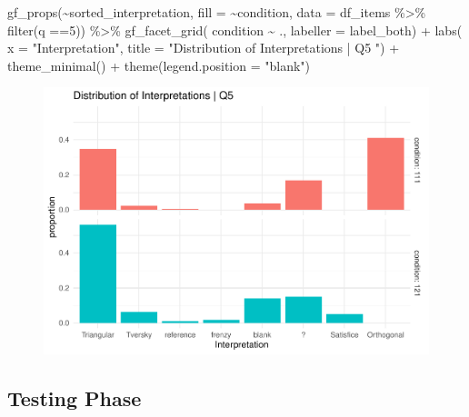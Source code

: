 \documentclass[
  letterpaper,
  DIV=11,
  numbers=noendperiod]{scrreprt}
\newenvironment{Shaded}{\begin{snugshade}}{\end{snugshade}}
\newcommand{\AttributeTok}[1]{\textcolor[rgb]{0.40,0.45,0.13}{#1}}
\newcommand{\DecValTok}[1]{\textcolor[rgb]{0.68,0.00,0.00}{#1}}
\newcommand{\FunctionTok}[1]{\textcolor[rgb]{0.28,0.35,0.67}{#1}}
\newcommand{\NormalTok}[1]{\textcolor[rgb]{0.00,0.23,0.31}{#1}}
\newcommand{\SpecialCharTok}[1]{\textcolor[rgb]{0.37,0.37,0.37}{#1}}
\newcommand{\StringTok}[1]{\textcolor[rgb]{0.13,0.47,0.30}{#1}}
\begin{document}
\begin{Shaded}
\begin{Highlighting}[]
\FunctionTok{gf\_props}\NormalTok{(}\SpecialCharTok{\textasciitilde{}}\NormalTok{sorted\_interpretation, }\AttributeTok{fill =} \SpecialCharTok{\textasciitilde{}}\NormalTok{condition, }\AttributeTok{data =}\NormalTok{ df\_items }\SpecialCharTok{\%\textgreater{}\%} \FunctionTok{filter}\NormalTok{(q }\SpecialCharTok{==}\DecValTok{5}\NormalTok{)) }\SpecialCharTok{\%\textgreater{}\%} 
  \FunctionTok{gf\_facet\_grid}\NormalTok{( condition }\SpecialCharTok{\textasciitilde{}}\NormalTok{ ., }\AttributeTok{labeller =}\NormalTok{ label\_both) }\SpecialCharTok{+} 
  \FunctionTok{labs}\NormalTok{( }\AttributeTok{x =} \StringTok{"Interpretation"}\NormalTok{, }\AttributeTok{title =} \StringTok{"Distribution of Interpretations | Q5 "}\NormalTok{) }\SpecialCharTok{+} 
  \FunctionTok{theme\_minimal}\NormalTok{() }\SpecialCharTok{+} \FunctionTok{theme}\NormalTok{(}\AttributeTok{legend.position =} \StringTok{"blank"}\NormalTok{)}
\end{Highlighting}
\end{Shaded}

\begin{figure}[H]

{\centering \includegraphics{analysis/SGC3A/2_sgc3A_scoring_files/figure-pdf/Q5-distribution-2.pdf}

}

\end{figure}

\hypertarget{testing-phase}{%
\subsection{Testing Phase}\label{testing-phase}}
\end{document}
